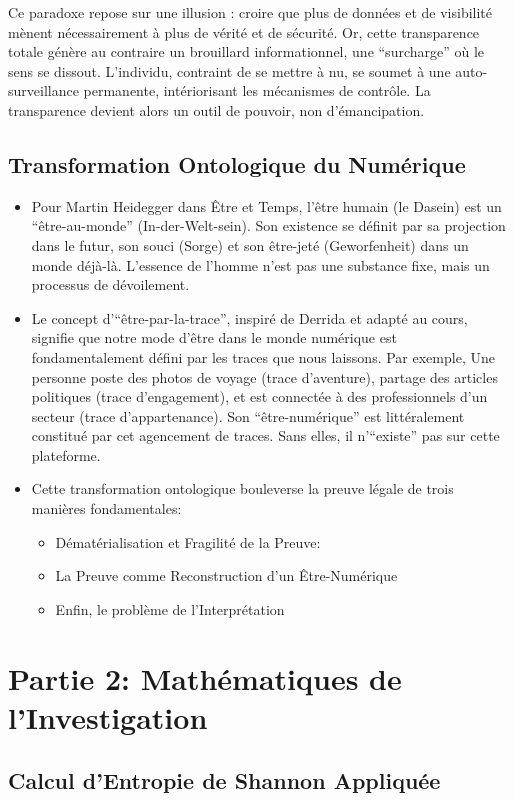 \documentclass[12pt, a4paper]{article}
\begin{document}
Ce paradoxe repose sur une illusion : croire que plus de données et de visibilité mènent nécessairement à plus de vérité et de sécurité. Or, cette transparence totale génère au contraire un brouillard informationnel, une “surcharge” où le sens se dissout. L’individu, contraint de se mettre à nu, se soumet à une auto-surveillance permanente, intériorisant les mécanismes de contrôle. La transparence devient alors un outil de pouvoir, non d’émancipation.
\subsection{Transformation Ontologique du Numérique}
\begin{itemize}
	\item Pour Martin Heidegger dans Être et Temps, l’être humain (le Dasein) est un “être-au-monde” (In-der-Welt-sein). Son existence se définit par sa projection dans le futur, son souci (Sorge) et son être-jeté (Geworfenheit) dans un monde déjà-là. L’essence de l’homme n’est pas une substance fixe, mais un processus de dévoilement.
	\item Le concept d’“être-par-la-trace”, inspiré de Derrida et adapté au cours, signifie que notre mode d’être dans le monde numérique est fondamentalement défini par les traces que nous laissons. Par exemple, Une personne poste des photos de voyage (trace d’aventure), partage des articles politiques (trace d’engagement), et est connectée à des professionnels d’un secteur (trace d’appartenance). Son “être-numérique” est littéralement constitué par cet agencement de traces. Sans elles, il n’“existe” pas sur cette plateforme.
	\item Cette transformation ontologique bouleverse la preuve légale de trois manières fondamentales:
	\begin{itemize}
		\item Dématérialisation et Fragilité de la Preuve:
		\item La Preuve comme Reconstruction d’un Être-Numérique
		\item Enfin, le problème de l’Interprétation
	\end{itemize}
\end{itemize}
\section*{Partie 2: Mathématiques de l’Investigation}
\subsection{Calcul d’Entropie de Shannon Appliquée}
\end{document}
